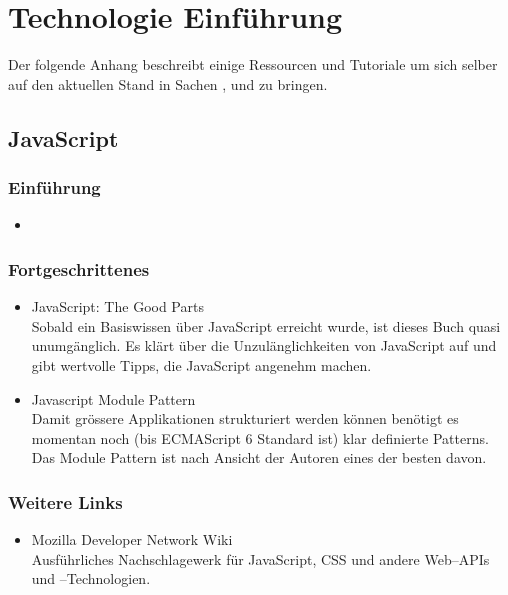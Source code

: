 \chapter{Technologie Einführung}

Der folgende Anhang beschreibt einige Ressourcen und Tutoriale um sich selber
auf den aktuellen Stand in Sachen ,
 und  zu bringen.

\section{JavaScript}
\label{sec:ti-javascript}

\subsection*{Einführung}
\begin{itemize}
	\item
\end{itemize}

\subsection*{Fortgeschrittenes}
\begin{itemize}
	\item JavaScript: The Good Parts \cite{Crockford:2008:JGP:1386753} \\
		Sobald ein Basiswissen über JavaScript erreicht wurde, ist dieses Buch
		quasi unumgänglich. Es klärt über die Unzulänglichkeiten von JavaScript
		auf und gibt wertvolle Tipps, die JavaScript angenehm machen.
	\item Javascript Module Pattern \cite{JSModulePattern} \\
		Damit grössere Applikationen strukturiert werden können benötigt es
		momentan noch (bis ECMAScript 6 Standard ist) klar definierte Patterns.
		Das Module Pattern ist nach Ansicht der Autoren eines der besten davon.
\end{itemize}

\subsection*{Weitere Links}
\begin{itemize}
	\item Mozilla Developer Network Wiki \cite{MDN} \\
		Ausführliches Nachschlagewerk für JavaScript, CSS und
		andere Web--APIs und --Technologien.
\end{itemize}


